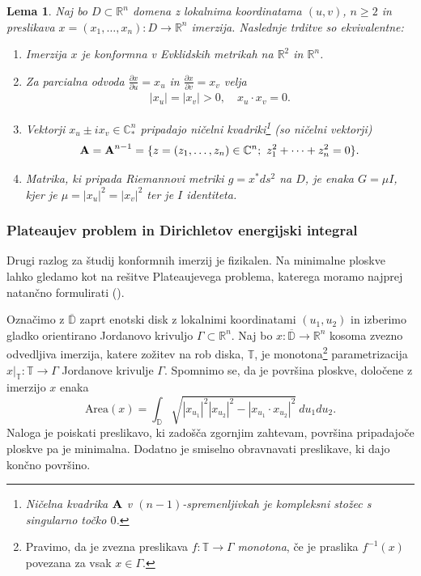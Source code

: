 \documentclass[12pt,a4paper,twoside]{article}
\theoremstyle{definition} %
\theoremstyle{plain} %
\newtheorem{lema}[definicija]{Lema}
\numberwithin{equation}{section}  %
\begin{document}
\begin{lema} \label{lema:konform-ekvivalence}
Naj bo $D \subset \mathbb{R}^{n}$ domena z lokalnima koordinatama $(u,v)$, $n \geq 2$ in preslikava $x = (x_{1}, \dots , x_{n}) \colon D \to \mathbb{R}^{n}$ imerzija. Naslednje trditve so ekvivalentne:
\begin{enumerate}
	\item Imerzija $x$ je konformna v Evklidskih metrikah na $\mathbb{R}^2$ in $\mathbb{R}^{n}$.
	\item Za parcialna odvoda $\frac{\partial x}{\partial u} = x_{u}$ in $\frac{\partial x}{\partial v} = x_{v}$ velja
		\begin{gather}
		|x_{u}| = |x_{v}| > 0, \quad x_{u} \cdot x_{v} = 0.
		\end{gather}
	\item Vektorji $x_{u} \pm ix_{v} \in \mathbb{C}_{*}^{n}$ pripadajo \emph{ničelni kvadriki}\footnote{Ničelna kvadrika $\textbf{\textup{A}}$ v $(n-1)$-spremenljivkah je kompleksni stožec s singularno točko $0$.} (so \emph{ničelni vektorji})
		\begin{gather}
		\textbf{\textup{A}} = \textbf{\textup{A}}^{n-1} = \{ z=(z_{1}, \dots , z_{n}) \in \mathbb{C}^{n}; \ z_{1}^2 + \cdots + z_{n}^2 = 0 \}.
		\end{gather}
	\item Matrika, ki pripada Riemannovi metriki $g = x^{*}ds^2$ na $D$, je enaka $G = \mu I$, kjer je $\mu = |x_{u}|^2 = |x_{v}|^2$ ter je $I$ identiteta.
\end{enumerate}
\end{lema}

\subsubsection{Plateaujev problem in Dirichletov energijski integral}
%
Drugi razlog za študij konformnih imerzij je fizikalen. Na minimalne ploskve lahko gledamo kot na rešitve Plateaujevega problema, katerega moramo najprej natančno formulirati (\cite[Section~2.1]{lawson1980lectures}).

Označimo z $\overline{\mathbb{D}}$ zaprt enotski disk z lokalnimi koordinatami $(u_{1}, u_{2})$ in izberimo gladko orientirano Jordanovo krivuljo $\Gamma \subset \mathbb{R}^{n}$.
Naj bo $x \colon \overline{\mathbb{D}} \to \mathbb{R}^{n}$ kosoma zvezno odvedljiva imerzija, katere zožitev na rob diska, $\mathbb{T}$, je monotona\footnote{Pravimo, da je zvezna preslikava $f \colon \mathbb{T} \to \Gamma$ \emph{monotona}, če je praslika $f^{-1}(x)$ povezana za vsak $x \in \Gamma$.} parametrizacija $x|_{\mathbb{T}} \colon \mathbb{T} \to \Gamma$ Jordanove krivulje $\Gamma$.
Spomnimo se, da je površina ploskve, določene z imerzijo $x$ enaka
\begin{equation} \label{eq:area}
\text{Area}(x) = \int_{\mathbb{D}} \sqrt{|x_{u_1}|^2 |x_{u_2}|^2 - |x_{u_1} \cdot x_{u_2}|^2} \ du_{1}du_{2}.
\end{equation}
Naloga je poiskati preslikavo, ki zadošča zgornjim zahtevam, površina pripadajoče ploskve pa je minimalna. Dodatno je smiselno obravnavati preslikave, ki dajo končno površino.
\end{document}

